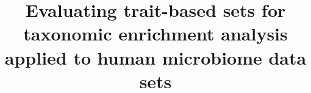 \documentclass{bmcart}
\begin{document}
\begin{frontmatter}

\begin{fmbox}


\title{Evaluating trait-based sets for taxonomic enrichment analysis applied to human microbiome data sets}


\author[
  addressref={aff1,aff2},                   
  email={quang.p.nguyen.gr@dartmouth.edu}   %
]{ }
\author[
  addressref={aff1,aff2},
  email={anne.g.hoen@dartmouth.edu}
]{ }
\author[
  addressref={aff1},
  corref={aff1},
  email={hildreth.r.frost@dartmouth.edu}
]{ }


\address[id=aff1]{%
  ,             %
  ,          %
  ,                              %
}
\address[id=aff2]{%
  ,
  ,
  ,
}


\end{fmbox}
\end{frontmatter}
\end{document}

